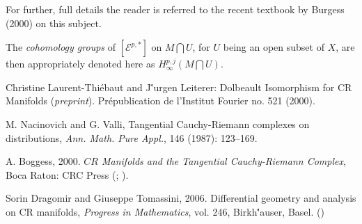 \documentclass[12pt]{article}
\theoremstyle{plain}
\theoremstyle{definition}
\numberwithin{equation}{section}
\newcommand{\E}{\mathcal E}
\begin{document}
For further, full details the reader is referred to the recent textbook by Burgess (2000) on this subject.

The \emph{cohomology groups} of $[{\E}^{p,*}]$ on $M \bigcap U$, for $U$ being an open subset
of $X$, are then appropriately denoted here as $H_{\infty}^{p,j}(M\bigcap U)$.


\begin{thebibliography}{9}

Christine Laurent-Thi\'ebaut and J\''urgen Leiterer: Dolbeault Isomorphism for CR Manifolds ({\em preprint}).
Pr\'epublication de l'Institut Fourier no. 521 (2000).

M. Nacinovich and G. Valli, Tangential Cauchy-Riemann complexes on distributions, \emph{Ann. Math. Pure Appl.},
146 (1987): 123--169.

A. Boggess, 2000. \emph{$CR$ Manifolds and the Tangential Cauchy-Riemann Complex}, Boca Raton: CRC Press
(;
).

Sorin Dragomir and Giuseppe Tomassini, 2006. Differential geometry and analysis on CR manifolds,
{\em Progress in Mathematics}, vol. 246, Birkh\''auser, Basel.
()

\end{thebibliography}
\end{document}
